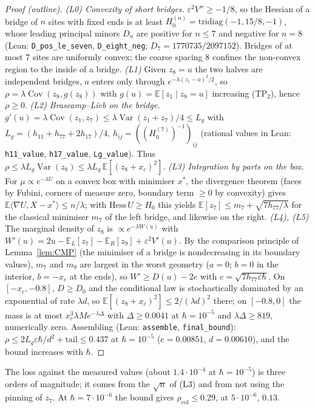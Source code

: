 \documentclass[11pt,a4paper]{article}
\theoremstyle{definition}
\theoremstyle{remark}
\newcommand{\E}{\mathbb{E}}
\newcommand{\Var}{\operatorname{Var}}
\newcommand{\Cov}{\operatorname{Cov}}
\newcommand{\xc}{x_c}
\newcommand{\rcol}{\rho_{\mathrm{col}}}
\newcommand{\code}[1]{\texttt{#1}}
\begin{document}
\begin{proof}[Proof (outline)]
\emph{(L0) Convexity of short bridges.} $\varepsilon^2V''\ge-1/8$, so the Hessian of a bridge of $n$ sites with fixed ends is at least $H_0^{(n)}=\mathrm{tridiag}(-1,15/8,-1)$, whose leading principal minors $D_n$ are positive for $n\le7$ and negative for $n=8$ (Lean: \code{D\_pos\_le\_seven}, \code{D\_eight\_neg}; $D_7=1770735/2097152$). Bridges of at most $7$ sites are uniformly convex; the coarse spacing $8$ confines the non-convex region to the inside of a bridge.
\emph{(L1)} Given $z_8=u$ the two halves are independent bridges, $a$ enters only through $e^{-\lambda(z_1-a)^2/2}$, so $\rho=\lambda\Cov(z_8,g(z_8))$ with $g(u)=\E[z_1\mid z_8=u]$ increasing (TP$_2$), hence $\rho\ge0$.
\emph{(L2) Brascamp--Lieb on the bridge.} $g'(u)=\lambda\Cov(z_1,z_7)\le\lambda\Var(z_1+z_7)/4\le L_g$ with $L_g=(h_{11}+h_{77}+2h_{17})/4$, $h_{ij}=((H_0^{(7)})^{-1})_{ij}$ (rational values in Lean: \code{h11\_value}, \code{h17\_value}, \code{Lg\_value}). Thus $\rho\le\lambda L_g\Var(z_8)\le\lambda L_g\,\E[(z_8+\xc)^2]$.
\emph{(L3) Integration by parts on the box.} For $\mu\propto e^{-\lambda U}$ on a convex box with minimiser $x^*$, the divergence theorem (faces by Fubini, corners of measure zero, boundary term $\ge0$ by convexity) gives $\E\langle\nabla U,X-x^*\rangle\le n/\lambda$; with $\mathrm{Hess}\,U\ge H_0$ this yields $\E[z_7]\le m_7+\sqrt{7h_{77}/\lambda}$ for the classical minimiser $m_7$ of the left bridge, and likewise on the right.
\emph{(L4), (L5)} The marginal density of $z_8$ is $\propto e^{-\lambda W(u)}$ with $W'(u)=2u-\E_L[z_7]-\E_R[z_9]+\varepsilon^2V'(u)$. By the comparison principle of Lemma~\ref{lem:CMP} (the minimiser of a bridge is nondecreasing in its boundary values), $m_7$ and $m_9$ are largest in the worst geometry ($a=0$; $b=0$ in the interior, $b=-\xc$ at the ends), so $W'\ge D(u)-2e$ with $e=\sqrt{7h_{77}\varepsilon\hbar}$. On $[-\xc,-0.8]$, $D\ge D_0$ and the conditional law is stochastically dominated by an exponential of rate $\lambda d$, so $\E[(z_8+\xc)^2]\le2/(\lambda d)^2$ there; on $[-0.8,0]$ the mass is at most $\xc^3\lambda M e^{-\lambda\Delta}$ with $\Delta\ge0.0041$ at $\hbar=10^{-5}$ and $\lambda\Delta\ge819$, numerically zero. Assembling (Lean: \code{assemble}, \code{final\_bound}): $\rho\le2L_g\varepsilon\hbar/d^2+\text{tail}\le0.437$ at $\hbar=10^{-5}$ ($e=0.00851$, $d=0.00610$), and the bound increases with $\hbar$.
\end{proof}
The loss against the measured values (about $1.4\cdot10^{-4}$ at $\hbar=10^{-5}$) is three orders of magnitude; it comes from the $\sqrt n$ of (L3) and from not using the pinning of $z_7$. At $\hbar=7\cdot10^{-6}$ the bound gives $\rcol\le0.29$, at $5\cdot10^{-6}$, $0.13$.
\end{document}
